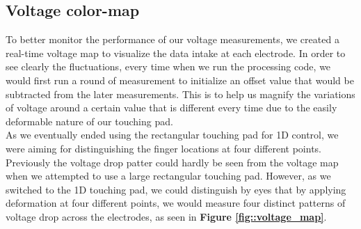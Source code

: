 \documentclass[reprint,amsmath, amsfonts, amssymb, aps, letterpaper]{revtex4-1}
\begin{document}
\subsection{Voltage color-map}
To better monitor the performance of our voltage measurements, we created a real-time voltage map to visualize the data intake at each electrode. In order to see clearly the fluctuations, every time when we run the processing code, we would first run a round of measurement to initialize an offset value that would be subtracted from the later measurements. This is to help us magnify the variations of voltage around a certain value that is different every time due to the easily deformable nature of our touching pad.
\\\indent As we eventually ended using the rectangular touching pad for 1D control, we were aiming for distinguishing the finger locations at four different points. Previously the voltage drop patter could hardly be seen from the voltage map when we attempted to use a large rectangular touching pad. However, as we switched to the 1D touching pad, we could distinguish by eyes that by applying deformation at four different points, we would measure four distinct patterns of voltage drop across the electrodes, as seen in \textbf{Figure  \ref{fig::voltage_map}}.
\end{document}
